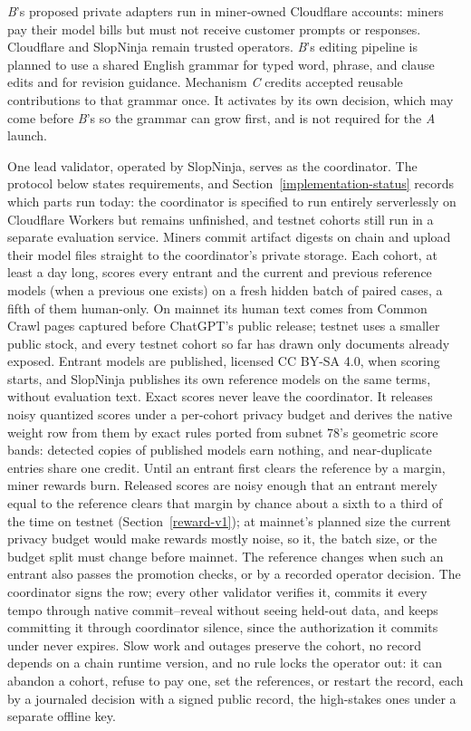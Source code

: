 \textit{B}'s proposed private adapters run in miner-owned Cloudflare accounts:
miners pay their model bills but must not receive customer prompts or responses.
Cloudflare and SlopNinja remain trusted operators. \textit{B}'s editing
pipeline is planned to use a shared English grammar for typed word, phrase, and
clause edits and for revision guidance. Mechanism \textit{C} credits accepted
reusable contributions to that grammar once. It activates by its own decision,
which may come before \textit{B}'s so the grammar can grow first, and is not
required for the \textit{A} launch.

One lead validator, operated by SlopNinja, serves as the coordinator. The
protocol below states requirements, and Section~\ref{implementation-status}
records which parts run today: the coordinator is specified to run entirely
serverlessly on Cloudflare Workers but remains unfinished, and testnet cohorts
still run in a separate evaluation service. Miners commit artifact digests on
chain and upload their model files straight to the coordinator's private
storage. Each cohort, at least a day long, scores every entrant and the
current and previous reference models (when a previous one exists) on a fresh
hidden batch of paired cases, a fifth of them human-only. On mainnet its human
text comes from Common Crawl pages captured before ChatGPT's public release;
testnet uses a smaller public stock, and every testnet cohort so far has drawn
only documents already exposed. Entrant models are published, licensed
CC BY-SA 4.0, when scoring starts, and SlopNinja publishes its own reference
models on the same terms, without evaluation text. Exact scores never leave the
coordinator. It releases noisy quantized scores under a per-cohort privacy
budget and derives the native weight row from them by exact rules ported from
subnet 78's geometric score bands: detected copies of published models earn
nothing, and near-duplicate entries share one credit. Until an entrant first
clears the reference by a margin, miner rewards burn. Released scores are noisy
enough that an entrant merely equal to the reference clears that margin by
chance about a sixth to a third of the time on testnet
(Section~\ref{reward-v1}); at mainnet's planned size the current privacy
budget would make rewards mostly noise, so it, the batch size, or the budget
split must change before mainnet. The reference changes
when such an entrant also passes the promotion checks, or by a recorded
operator decision. The coordinator signs the row; every other validator
verifies it, commits it every tempo through native commit--reveal without
seeing held-out data, and keeps committing it through coordinator silence,
since the authorization it commits under never expires. Slow work and outages
preserve the cohort, no record depends on a chain runtime version, and no rule
locks the operator out: it can abandon a cohort, refuse to pay one, set the
references, or restart the record, each by a journaled decision with a signed
public record, the high-stakes ones under a separate offline key.

